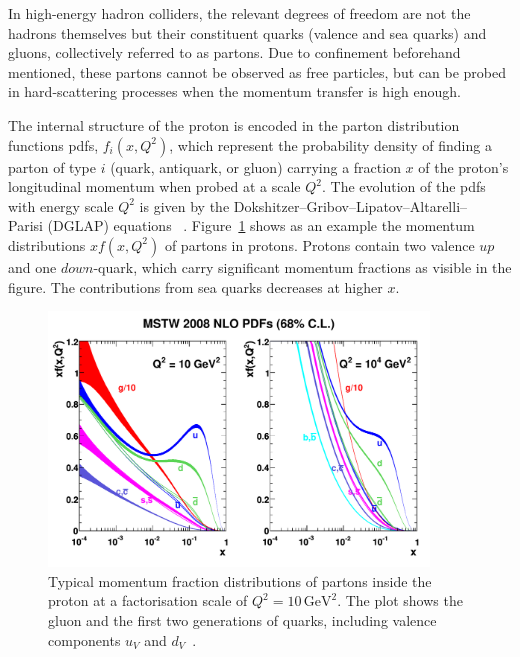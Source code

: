In high-energy hadron colliders, the relevant degrees of freedom are not the hadrons themselves but their constituent quarks (valence and sea quarks) and gluons, collectively referred to as partons. Due to confinement beforehand mentioned, these partons cannot be observed as free particles, but can be probed in hard-scattering processes when the momentum transfer is high enough.

The internal structure of the proton is encoded in the parton distribution functions \acrshort{pdf}s, \(f_i(x, Q^2)\), which represent the probability density of finding a parton of type \(i\) (quark, antiquark, or gluon) carrying a fraction \(x\) of the proton's longitudinal momentum when probed at a scale \(Q^2\). The evolution of the \acrshort{pdf}s with energy scale $Q^2$ is given by the Dokshitzer–Gribov–Lipatov–Altarelli–\\Parisi (DGLAP) equations ~\cite{Gribov, ALTARELLI, Dokshitzer}. Figure~\ref{fig:pdfs} shows as an example the momentum distributions $xf(x,Q^2)$ of partons in protons. Protons contain two valence $up$ and one $down$-quark, which carry significant momentum fractions as visible in the figure. The contributions from sea quarks decreases at higher $x$.
\begin{figure}[htbp]
  \centering
  \includegraphics[width=0.9\textwidth]{images/pdfs.pdf}
  \caption{Typical momentum fraction distributions of partons inside the proton at a factorisation scale of \(Q^2 = 10\,\text{GeV}^2\). The plot shows the gluon and the first two generations of quarks, including valence components \(u_V\) and \(d_V\)~\cite{Martin_2009}.}
  \label{fig:pdfs}
\end{figure}

